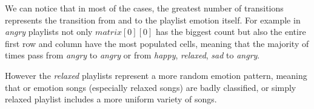 We can notice that in most of the cases, the greatest number of transitions represents the transition from and to the playlist emotion itself. For example in \textit{angry} playlists not only $matrix[0][0]$ has the biggest count  but also the entire first row and column have the most populated cells, meaning that the majority of times pass from \textit{angry} to \textit{angry} or from \textit{happy}, \textit{relaxed}, \textit{sad} to \textit{angry}. \par

However the \textit{relaxed} playlists represent a more random emotion pattern, meaning that or emotion songs (especially relaxed songs) are badly classified,  or simply relaxed playlist includes a more uniform variety of songs. \par











